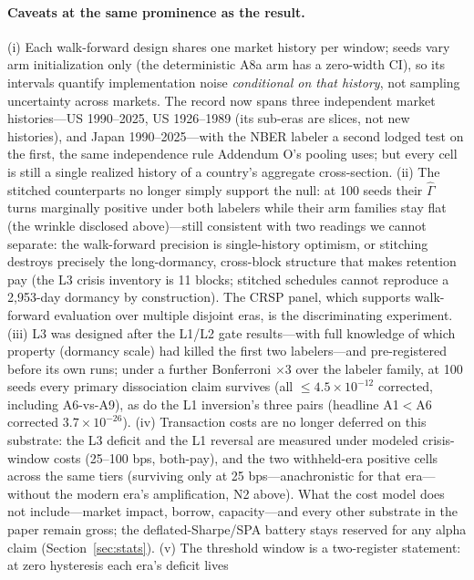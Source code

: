 \documentclass{article}
\begin{document}
\paragraph{Caveats at the same prominence as the result.} (i) Each
walk-forward design shares one market history per window; seeds vary
arm initialization only (the deterministic A8a arm has a zero-width
CI), so its intervals quantify implementation noise \emph{conditional
on that history}, not sampling uncertainty across markets. The
record now spans three independent market histories---US 1990--2025,
US 1926--1989 (its sub-eras are slices, not new histories), and
Japan 1990--2025---with the NBER labeler a second lodged test on the
first, the same independence rule Addendum O's pooling uses; but
every cell is still a single realized history of a country's
aggregate cross-section. (ii) The stitched counterparts no longer
simply support the null: at 100 seeds their $\hat\Gamma$ turns
marginally positive under both labelers while their arm families stay
flat (the wrinkle disclosed above)---still consistent with two
readings we cannot separate: the walk-forward precision is
single-history optimism, or stitching destroys precisely the
long-dormancy, cross-block structure that makes retention pay (the L3
crisis inventory is 11 blocks; stitched schedules cannot reproduce a
2{,}953-day dormancy by construction). The CRSP panel, which supports
walk-forward evaluation over multiple disjoint eras, is the
discriminating experiment. (iii) L3 was designed after the
L1/L2 gate results---with full knowledge of which property (dormancy
scale) had killed the first two labelers---and pre-registered before
its own runs; under a further Bonferroni $\times 3$ over the labeler
family, at 100 seeds every primary dissociation claim survives (all
$\le 4.5\times10^{-12}$ corrected, including A6-vs-A9), as do the
L1 inversion's three pairs (headline A1$<$A6 corrected
$3.7\times10^{-26}$). (iv) Transaction costs are no longer deferred on
this substrate: the L3 deficit and the L1 reversal are measured under
modeled crisis-window costs (25--100 bps, both-pay), and the two
withheld-era positive cells across the same tiers (surviving only
at 25 bps---anachronistic for that era---without the modern era's
amplification, N2 above). What
the cost
model does not include---market impact, borrow, capacity---and every
other substrate in the paper remain gross; the deflated-Sharpe/SPA
battery stays reserved for any alpha claim
(Section~\ref{sec:stats}). (v) The threshold window is a
two-register statement: at zero hysteresis each era's deficit lives
\end{document}
